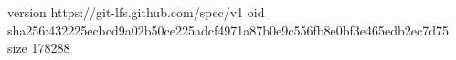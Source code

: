 version https://git-lfs.github.com/spec/v1
oid sha256:432225ecbcd9a02b50ce225adcf4971a87b0e9c556fb8e0bf3e465edb2ec7d75
size 178288
